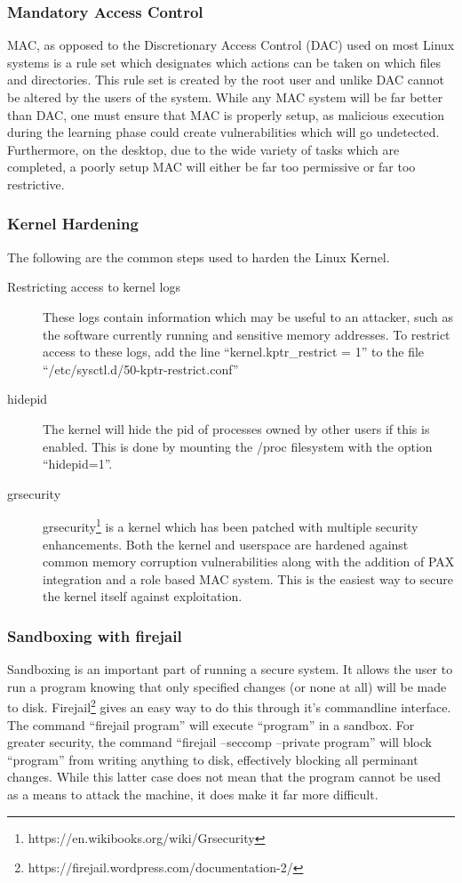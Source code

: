 \documentclass[a4paper,11pt]{book}
\begin{document}
			\subsubsection{Mandatory Access Control}
				MAC, as opposed to the Discretionary Access Control (DAC) used on most Linux systems is a rule set which designates which actions can be taken on which files and directories. 
				This rule set is created by the root user and unlike DAC cannot be altered by the users of the system. 
				While any MAC system will be far better than DAC, one must ensure that MAC is properly setup, as malicious execution during the learning phase could create vulnerabilities which will go undetected. 
				Furthermore, on the desktop, due to the wide variety of tasks which are completed, a poorly setup MAC will either be far too permissive or far too restrictive. 
			\subsubsection{Kernel Hardening}
				The following are the common steps used to harden the Linux Kernel. 
				\begin{description}
					\item[Restricting access to kernel logs]
						These logs contain information which may be useful to an attacker, such as the software currently running and sensitive memory addresses. 
						To restrict access to these logs, add the line ``kernel.kptr\_restrict = 1'' to the file ``/etc/sysctl.d/50-kptr-restrict.conf''
					\item[hidepid] 
						The kernel will hide the pid of processes owned by other users if this is enabled. This is done by mounting the /proc filesystem with the option ``hidepid=1''. 
					\item[grsecurity]
						grsecurity\footnote{https://en.wikibooks.org/wiki/Grsecurity} is a kernel which has been patched with multiple security enhancements. 
						Both the kernel and userspace are hardened against common memory corruption vulnerabilities along with the addition of PAX integration and a role based MAC system. This is the easiest way to secure the kernel itself against exploitation. 
				\end{description}
				\subsubsection{Sandboxing with firejail}
					Sandboxing is an important part of running a secure system. 
					It allows the user to run a program knowing that only specified changes (or none at all) will be made to disk. 
					Firejail\footnote{https://firejail.wordpress.com/documentation-2/} gives an easy way to do this through it's commandline interface. 
					The command ``firejail program'' will execute ``program'' in a sandbox. 
					For greater security, the command ``firejail --seccomp --private program'' will block ``program'' from writing anything to disk, effectively blocking all perminant changes. 
					While this latter case does not mean that the program cannot be used as a means to attack the machine, it does make it far more difficult. 
\end{document}
